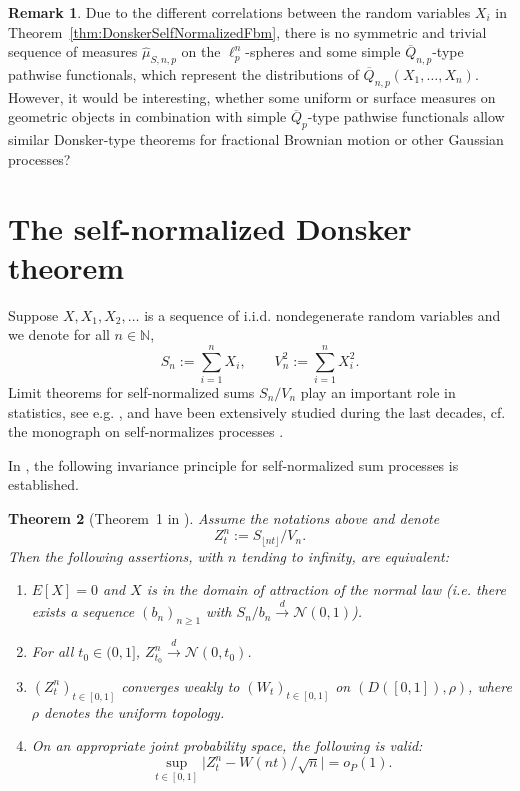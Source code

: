 \documentclass[numbers,compress,v1.0.1]{vmsta}
\newtheorem{theorem}{Theorem}
\theoremstyle{definition}
\newtheorem{remark}[theorem]{Remark}
\def\N{\mathbb{N}}
\begin{document}
\begin{remark}
Due to the different correlations between the random variables $X_i$ in
Theorem~\ref{thm:DonskerSelfNormalizedFbm}, there is no symmetric and trivial
sequence of measures $\hat{\mu}_{S,n,p}$ on the $\ell ^n_p$-spheres and some
simple $\overline{Q}_{n,p}$-type pathwise functionals, which represent the
distributions of $\overline {Q}_{n,p}(X_1,\ldots, X_n)$. However, it would be
interesting, whether some uniform or surface measures on geometric objects in
combination with simple $\overline{Q}_{p}$-type pathwise functionals allow
similar Donsker-type theorems for fractional Brownian motion or other
Gaussian processes?
\end{remark}

\section{The self-normalized Donsker theorem}\label{section3}

Suppose $X,X_1,X_2,\ldots$ is a sequence of i.i.d. nondegenerate random
variables and we denote for all $n \in\N$,
%
\[
S_n := \sum_{i=1}^{n}X_i,
\qquad V_n^2 := \sum_{i=1}^n
X_i^2.
\]
%
Limit theorems for self-normalized sums $S_n/V_n$ play an important
role in statistics, see e.g. \cite{Gine}, and have been extensively
studied during the last decades, cf. the monograph on self-normalizes
processes \cite{delaPena}.

In \cite{Csorgo}, the following invariance principle for
self-normalized sum processes is established.

\begin{theorem}[Theorem~1 in \cite{Csorgo}]\label{thm:Csorgo}
Assume the notations above and denote
%
\[
Z^n_t := S_{\lfloor nt \rfloor}/V_n.
\]
%
Then the following assertions, with $n$ tending to infinity, are equivalent:
%
\begin{enumerate}
%
\item[(a)] $E[X]=0$ and $X$ is in the domain of attraction of the
normal law (i.e. there exists a sequence $(b_n)_{n \geq1}$ with
$S_n/b_n \stackrel{d}{\rightarrow} \mathcal{N}(0,1)$).
%
\item[(b)] For all $t_0 \in(0,1]$, $Z^n_{t_0} \stackrel{d}{\rightarrow
} \mathcal{N}(0,t_0)$.
%
\item[(c)] $(Z^n_t)_{t \in[0,1]}$ converges weakly to $(W_t)_{t \in
[0,1]}$ on $(D([0,1]), \rho)$, where $\rho$ denotes the uniform topology.
%
\item[(d)] On an appropriate joint probability space, the following is valid:
%
\[
\sup_{t \in[0,1]} \bigl|Z^n_{t} - W(nt)/\sqrt{n}\bigr| =
o_P(1).
\]
%
\end{enumerate}
%
\end{theorem}
\end{document}
